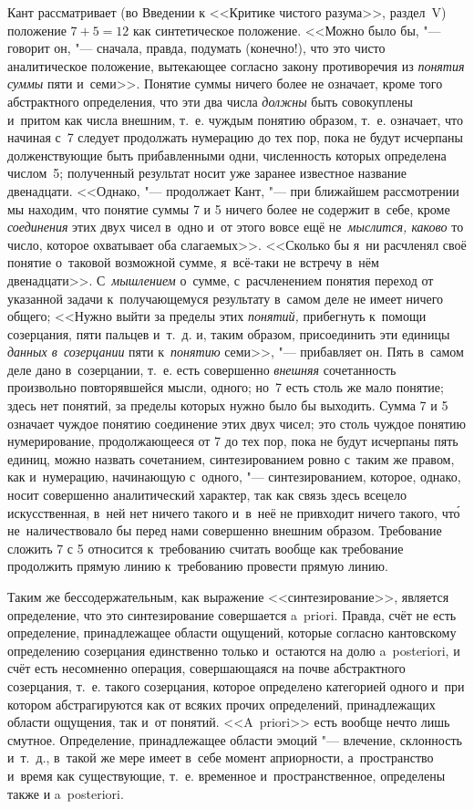 Кант рассматривает (во Введении к <<Критике чистого разума>>, раздел~V)
положение $7+5=12$ как синтетическое положение. <<Можно было бы, "---
говорит он, "--- сначала, правда, подумать (конечно!), что это чисто
аналитическое положение, вытекающее согласно закону противоречия из
{\em понятия суммы} пяти и~семи>>. Понятие суммы ничего более не означает,
кроме того абстрактного определения, что эти два числа {\em должны} быть
совокуплены и~притом как числа внешним, т.~е. чуждым понятию образом, т.~е.
означает, что начиная с~7 следует продолжать нумерацию до тех пор, пока не
будут исчерпаны долженствующие быть прибавленными одни, численность которых
определена числом~5; полученный результат носит уже заранее известное название
двенадцати. <<Однако, "--- продолжает Кант, "--- при ближайшем рассмотрении мы
находим, что понятие суммы 7 и 5 ничего более не содержит в~себе, кроме
{\em соединения} этих двух чисел в~одно и~от этого вовсе ещё
не~{\em мыслится, каково} то число, которое охватывает оба слагаемых>>.
<<Сколько бы я~ни расчленял своё понятие о~таковой возможной сумме,
я~всё-таки не встречу в~нём двенадцати>>. С~{\em мышлением} о~сумме,
с~расчленением понятия переход от указанной задачи к~получающемуся результату
в~самом деле не имеет ничего общего; <<Нужно выйти за пределы этих
{\em понятий,} прибегнуть к~помощи
созерцания, пяти пальцев и~т.~д. и, таким образом, присоединить эти
единицы {\em данных в~созерцании} пяти к~{\em понятию} семи>>, "--- прибавляет
он. Пять в~самом деле дано в~созерцании, т.~е. есть совершенно {\em внешняя}
сочетанность произвольно повторявшейся мысли, одного; но~7 есть столь же мало
понятие; здесь нет понятий, за пределы которых нужно было бы выходить. Сумма
7 и 5 означает чуждое понятию соединение этих двух чисел; это столь чуждое
понятию нумерирование, продолжающееся от 7 до тех пор, пока не будут исчерпаны
пять единиц, можно назвать сочетанием, синтезированием ровно с~таким же правом,
как и~нумерацию, начинающую с~одного, "--- синтезированием, которое, однако,
носит совершенно аналитический характер, так как связь здесь всецело
искусственная, в~ней нет ничего такого и~в~неё не привходит ничего такого,
чт\'{о} не~наличествовало бы перед нами совершенно внешним образом. Требование
сложить 7 с 5 относится к~требованию считать вообще как требование продолжить
прямую линию к~требованию провести прямую линию.

Таким же бессодержательным, как выражение <<синтезирование>>, является
определение, что это синтезирование совершается a~priori. Правда, счёт не
есть определение, принадлежащее области ощущений, которые согласно кантовскому
определению созерцания единственно только и~остаются на долю a~poste\-riori, и
счёт есть несомненно операция, совершающаяся на почве абстрактного
созерцания, т.~е. такого созерцания, которое определено категорией одного и~при
котором абстрагируются как от всяких прочих определений, принадлежащих области
ощущения, так и~от понятий. <<A~priori>> есть вообще нечто лишь смутное.
Определение, принадлежащее области эмоций "--- влечение, склонность и~т.~д.,
в~такой же мере имеет в~себе момент априорности, а~пространство и~время как
существующие, т.~е. временное и~пространственное, определены также и
a~poste\-ri\-ori.

